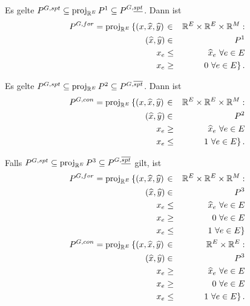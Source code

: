 \documentclass[10p,a4paper,BCOR = 12mm, DIV=15]{scrbook}
\begin{document}
{\begin{Kor}
Es gelte $P^{G, spt} \subseteq \operatorname{proj}_{\mathbb{R}^{E}} P^1 \subseteq P^{G, \underline{spt}}$. Dann ist
\begin{eqnarray*}
P^{G, for} = \operatorname{proj}_{\mathbb{R}^{E}} \left\{\left(x, \widehat{x}, \widehat{y}\right) \right. & \in & \mathbb{R}^E \times \mathbb{R}^E \times \mathbb{R}^M: \nonumber \\
\left(\widehat{x}, \widehat{y}\right) & \in & P^1 \\
x_e & \leq & \widehat{x}_e\ \forall e \in E \\
x_e & \geq & \left.0\ \forall e \in E\right\}.
\end{eqnarray*}

Es gelte $P^{G, spt} \subseteq \operatorname{proj}_{\mathbb{R}^{E}} P^2 \subseteq P^{G, \overline{spt}}$. Dann ist
\begin{eqnarray*}
P^{G, con} = \operatorname{proj}_{\mathbb{R}^{E}} \left\{\left(x, \widehat{x}, \widehat{y}\right) \right. & \in & \mathbb{R}^E \times \mathbb{R}^E \times \mathbb{R}^M: \nonumber \\
\left(\widehat{x}, \widehat{y}\right) & \in & P^2 \\
x_e & \geq & \widehat{x}_e\ \forall e \in E \\
x_e & \leq & \left.1\ \forall e \in E\right\}.
\end{eqnarray*}

Falls $P^{G, spt} \subseteq \operatorname{proj}_{\mathbb{R}^{E}} P^3 \subseteq P^{G, \overline{\underline{spt}}}$ gilt, ist
\begin{eqnarray*}
P^{G, for} = \operatorname{proj}_{\mathbb{R}^{E}} \left\{\left(x, \widehat{x}, \widehat{y}\right) \right. & \in & \mathbb{R}^E \times \mathbb{R}^E \times \mathbb{R}^M: \nonumber \\
\left(\widehat{x}, \widehat{y}\right) & \in & P^3 \\
x_e & \leq & \widehat{x}_e\ \forall e \in E \\
x_e & \geq & 0\ \forall e \in E \\
x_e & \leq & \left.1\ \forall e \in E\right\} \\
P^{G, con} = \operatorname{proj}_{\mathbb{R}^{E}} \left\{\left(x, \widehat{x}, \widehat{y}\right) \right. & \in & \mathbb{R}^E \times \mathbb{R}^E: \nonumber \\
\left(\widehat{x}, \widehat{y}\right) & \in & P^3 \\
x_e & \geq & \widehat{x}_e\ \forall e \in E \\
x_e & \geq & 0\ \forall e \in E \\
x_e & \leq & \left.1\ \forall e \in E\right\}.
\end{eqnarray*}
\end{Kor}

}
\end{document}
